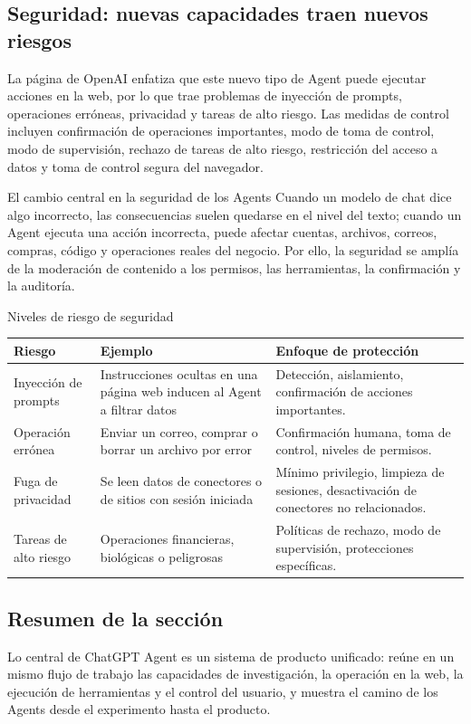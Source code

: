 \subsection{Seguridad: nuevas capacidades traen nuevos riesgos}

La página de OpenAI enfatiza que este nuevo tipo de Agent puede ejecutar acciones en la web, por lo que trae problemas de inyección de prompts, operaciones erróneas, privacidad y tareas de alto riesgo. Las medidas de control incluyen confirmación de operaciones importantes, modo de toma de control, modo de supervisión, rechazo de tareas de alto riesgo, restricción del acceso a datos y toma de control segura del navegador.

\begin{warningbox}{El cambio central en la seguridad de los Agents}
Cuando un modelo de chat dice algo incorrecto, las consecuencias suelen quedarse en el nivel del texto; cuando un Agent ejecuta una acción incorrecta, puede afectar cuentas, archivos, correos, compras, código y operaciones reales del negocio. Por ello, la seguridad se amplía de la moderación de contenido a los permisos, las herramientas, la confirmación y la auditoría.
\end{warningbox}

\begin{knowledgebox}{Niveles de riesgo de seguridad}
\begin{tabularx}{\textwidth}{p{}p{}X}
\toprule
Riesgo & Ejemplo & Enfoque de protección \\
\midrule
Inyección de prompts & Instrucciones ocultas en una página web inducen al Agent a filtrar datos & Detección, aislamiento, confirmación de acciones importantes. \\
Operación errónea & Enviar un correo, comprar o borrar un archivo por error & Confirmación humana, toma de control, niveles de permisos. \\
Fuga de privacidad & Se leen datos de conectores o de sitios con sesión iniciada & Mínimo privilegio, limpieza de sesiones, desactivación de conectores no relacionados. \\
Tareas de alto riesgo & Operaciones financieras, biológicas o peligrosas & Políticas de rechazo, modo de supervisión, protecciones específicas. \\
\bottomrule
\end{tabularx}
\end{knowledgebox}

\subsection{Resumen de la sección}

Lo central de ChatGPT Agent es un sistema de producto unificado: reúne en un mismo flujo de trabajo las capacidades de investigación, la operación en la web, la ejecución de herramientas y el control del usuario, y muestra el camino de los Agents desde el experimento hasta el producto.

